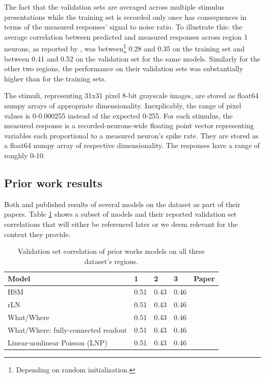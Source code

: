 The fact that the validation sets are averaged across multiple stimulus presentations while the training set is recorded only once has consequences in terms of the measured responses’ signal to noise ratio. To illustrate this: the average correlation between predicted and measured responses across region 1 neurons, as reported by \cite{antolik}, was between\footnote{Depending on random initialization.} 0.28 and 0.35 on the training set and between 0.41 and 0.52 on the validation set for the same models. Similarly for the other two regions, the performance on their validation sets was substantially higher than for the training sets. 

The stimuli, representing 31x31 pixel 8-bit grayscale images, are stored as float64 numpy arrays of appropriate dimensionality. Inexplicably, the range of pixel values is 0-0.000255 instead of the expected 0-255. For each stimulus, the measured response is a recorded-neurons-wide floating point vector representing variables each proportional to a measured neuron’s spike rate. They are stored as a float64 numpy array of respective dimensionality. The responses have a range of roughly 0-10.

\subsection{Prior work results}\label{ch:4.1.2}

Both \cite{antolik} and \cite{klindt} published results of several models on the \citeauthor{antolik} dataset as part of their papers. Table \ref{tab:4.2} shows a subset of models and their reported validation set correlations that will either be referenced later or we deem relevant for the context they provide.

\begin{table}[ht]
    \renewcommand{\arraystretch}{1.0}
    \centering
    \begin{tabular}{l|l|l|l|l}
        \toprule
        \textbf{Model} & \textbf{1} & \textbf{2} & \textbf{3} & \textbf{Paper} \\ \midrule
        HSM & 0.51 & 0.43 & 0.46 & \citeauthor{antolik} \\ 
        rLN & 0.51 & 0.43 & 0.46 & \citeauthor{antolik} \\ 
        What/Where & 0.51 & 0.43 & 0.46 & \citeauthor{antolik} \\ 
        What/Where: fully-connected readout & 0.51 & 0.43 & 0.46 & \citeauthor{klindt} \\ 
        Linear-nonlinear Poisson (LNP) & 0.51 & 0.43 & 0.46 & \citeauthor{klindt} \\ \bottomrule
    \end{tabular}
    \caption[Performance of prior works.]{Validation set correlation of prior works models on all three dataset’s regions.}
    \label{tab:4.2}
    \renewcommand{\arraystretch}{1.0}
\end{table}

